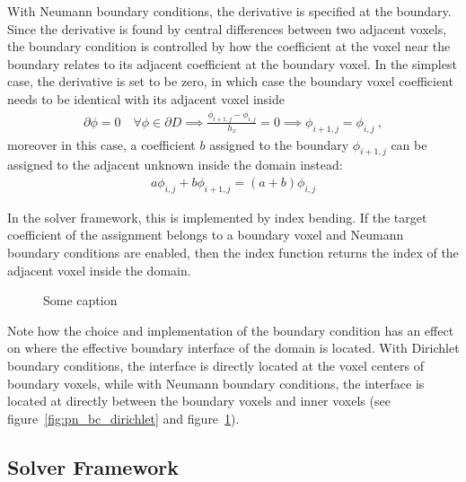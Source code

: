 With Neumann boundary conditions, the derivative is specified at the boundary. Since the derivative is found by central differences between two adjacent voxels, the boundary condition is controlled by how the coefficient at the voxel near the boundary relates to its adjacent coefficient at the boundary voxel. In the simplest case, the derivative is set to be zero, in which case the boundary voxel coefficient needs to be identical with its adjacent voxel inside
\begin{align*}
\partial\phi=0\quad\forall\phi\in\partial D
\implies
\frac{\phi_{i+1,j}-\phi_{i,j}}{h_x} = 0
\implies
\phi_{i+1,j}=\phi_{i,j}
\ ,
\end{align*}
moreover in this case, a coefficient $b$ assigned to the boundary $\phi_{i+1,j}$ can be assigned to the adjacent unknown inside the domain instead:
\begin{align}
a\phi_{i,j} + b\phi_{i+1,j} = \left(a+b\right)\phi_{i,j}
\end{align}

In the solver framework, this is implemented by index bending. If the target coefficient of the assignment belongs to a boundary voxel and Neumann boundary conditions are enabled, then the index function returns the index of the adjacent voxel inside the domain.
\begin{figure}[h]
\centering
{}
\caption{Some caption}
\label{fig:pn_bc_neumann}
\end{figure}

Note how the choice and implementation of the boundary condition has an effect on where the effective boundary interface of the domain is located. With Dirichlet boundary conditions, the interface is directly located at the voxel centers of boundary voxels, while with Neumann boundary conditions, the interface is located at directly between the boundary voxels and inner voxels (see figure~\ref{fig:pn_bc_dirichlet} and figure~\ref{fig:pn_bc_neumann}).

\subsection{Solver Framework}
\label{sec:pn_framework}



